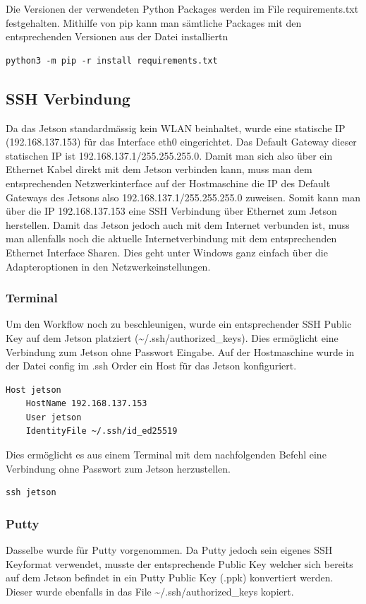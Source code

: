 Die Versionen der verwendeten Python Packages werden im File requirements.txt festgehalten. Mithilfe von pip kann man sämtliche Packages mit den entsprechenden Versionen aus der Datei installiertn

\begin{verbatim}
python3 -m pip -r install requirements.txt
\end{verbatim}

\subsection{SSH Verbindung}
Da das Jetson standardmässig kein WLAN beinhaltet, wurde eine statische IP (192.168.137.153) für das Interface eth0 eingerichtet. Das Default Gateway dieser statischen IP ist 192.168.137.1/255.255.255.0. Damit man sich also über ein Ethernet Kabel direkt mit dem Jetson verbinden kann, muss man dem entsprechenden Netzwerkinterface auf der Hostmaschine die IP des Default Gateways des Jetsons also 192.168.137.1/255.255.255.0 zuweisen. Somit kann man über die IP 192.168.137.153 eine SSH Verbindung über Ethernet zum Jetson herstellen. Damit das Jetson jedoch auch mit dem Internet verbunden ist, muss man allenfalls noch die aktuelle Internetverbindung mit dem entsprechenden Ethernet Interface Sharen. Dies geht unter Windows ganz einfach über die Adapteroptionen in den Netzwerkeinstellungen.

\subsubsection{Terminal}
Um den Workflow noch zu beschleunigen, wurde ein entsprechender SSH Public Key auf dem Jetson platziert (\textasciitilde/.ssh/authorized\_keys). Dies ermöglicht eine Verbindung zum Jetson ohne Passwort Eingabe. Auf der Hostmaschine wurde in der Datei config im .ssh Order ein Host für das Jetson konfiguriert.

\begin{verbatim}
Host jetson
	HostName 192.168.137.153
	User jetson
	IdentityFile ~/.ssh/id_ed25519
\end{verbatim}

Dies ermöglicht es aus einem Terminal mit dem nachfolgenden Befehl eine Verbindung ohne Passwort zum Jetson herzustellen.
\begin{verbatim}
ssh jetson
\end{verbatim}

\subsubsection{Putty}
Dasselbe wurde für Putty vorgenommen. Da Putty jedoch sein eigenes SSH Keyformat verwendet, musste der entsprechende Public Key welcher sich bereits auf dem Jetson befindet in ein Putty Public Key (.ppk) konvertiert werden. Dieser wurde ebenfalls in das File \textasciitilde/.ssh/authorized\_keys kopiert. 

